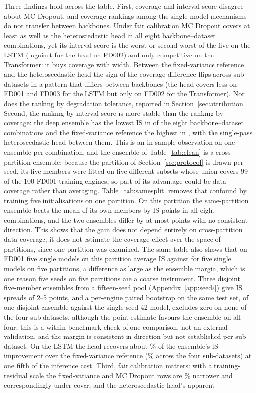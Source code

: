\documentclass[journal]{IEEEtran}
\newcommand{\IS}{\mathrm{IS}}\newcommand{\WIS}{\mathrm{WIS}}\newcommand{\foob}{f_{\mathrm{oob}}}
\begin{document}
Three findings hold across the table. First, coverage and interval score disagree about MC Dropout, and coverage rankings among the single-model mechanisms do not transfer between backbones. Under fair calibration MC Dropout covers at least as well as the heteroscedastic head in all eight backbone--dataset combinations, yet its interval score is the worst or second-worst of the five on the LSTM (\NMcdISFDtwo{} against \NHeadISFDtwo{} for the head on FD002) and only competitive on the Transformer: it buys coverage with width. Between the fixed-variance reference and the heteroscedastic head the sign of the coverage difference flips across sub-datasets in a pattern that differs between backbones (the head covers less on FD001 and FD003 for the LSTM but only on FD002 for the Transformer). Nor does the ranking by degradation tolerance, reported in Section~\ref{sec:attribution}. Second, the ranking by interval score is more stable than the ranking by coverage: the deep ensemble has the lowest $\IS$ in \NEnsBestIS{} of the eight backbone--dataset combinations and the fixed-variance reference the highest in \NFixWorstIS, with the single-pass heteroscedastic head between them. This is an in-sample observation on one ensemble per combination, and the ensemble of Table~\ref{tab:clean} is a cross-partition ensemble: because the partition of Section~\ref{sec:protocol} is drawn per seed, its five members were fitted on five different subsets whose union covers 99 of the 100 FD001 training engines, so part of its advantage could be data coverage rather than averaging. Table~\ref{tab:samesplit} removes that confound by training five initialisations on one partition. On this partition the same-partition ensemble beats the mean of its own members by \NSameGain{} $\IS$ points in all eight combinations, and the two ensembles differ by at most \NSameCrossMax{} points with no consistent direction. This shows that the gain does not depend entirely on cross-partition data coverage; it does not estimate the coverage effect over the space of partitions, since one partition was examined. The same table also shows that on FD001 five single models on this partition average \NOnePartSingleFDone{} $\IS$ against \NFivePartSingleFDone{} for five single models on five partitions, a difference as large as the ensemble margin, which is one reason five seeds on five partitions are a coarse instrument. Three disjoint five-member ensembles from a fifteen-seed pool (Appendix~\ref{app:seeds}) give $\IS$ spreads of 2--5 points, and a per-engine paired bootstrap on the same test set, of one disjoint ensemble against the single seed-42 model, excludes zero on none of the four sub-datasets, although the point estimate favours the ensemble on all four; this is a within-benchmark check of one comparison, not an external validation, and the margin is consistent in direction but not established per sub-dataset. On the LSTM the head recovers about \NHeadRecover\% of the ensemble's $\IS$ improvement over the fixed-variance reference (\NHeadRecoverRange\% across the four sub-datasets) at one fifth of the inference cost. Third, fair calibration matters: with a training-residual scale the fixed-variance and MC Dropout rows are \NFairRatio\% narrower and correspondingly under-cover, and the heteroscedastic head's apparent 
\end{document}
